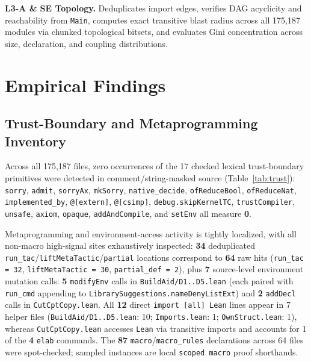 \documentclass[10pt,twocolumn]{article}
\newcommand{\ub}{\_\allowbreak}
\begin{document}
\noindent\textbf{L3-A \& SE Topology.} Deduplicates import edges, verifies DAG acyclicity and reachability from \texttt{Main}, computes exact transitive blast radius across all 175,187 modules via chunked topological bitsets, and evaluates Gini concentration across size, declaration, and coupling distributions.

\section{Empirical Findings}

\subsection{Trust-Boundary and Metaprogramming Inventory}
Across all 175,187 files, zero occurrences of the 17 checked lexical trust-boundary primitives were detected in comment/string-masked source (Table~\ref{tab:trust}): \texttt{sorry}, \texttt{admit}, \texttt{sorryAx}, \texttt{mkSorry}, \texttt{native\ub decide}, \texttt{ofReduceBool}, \texttt{ofReduceNat}, \texttt{implemented\ub by}, \texttt{@[extern]}, \texttt{@[csimp]}, \texttt{debug.skipKernelTC}, \texttt{trustCompiler}, \texttt{unsafe}, \texttt{axiom}, \texttt{opaque}, \texttt{addAndCompile}, and \texttt{setEnv} all measure \textbf{0}.

Metaprogramming and environment-access activity is tightly localized, with all non-macro high-signal sites exhaustively inspected: \textbf{34} deduplicated \texttt{run\ub tac}/\texttt{liftMetaTactic}/\texttt{partial} locations correspond to \textbf{64} raw hits (\texttt{run\ub tac = 32}, \texttt{liftMetaTactic = 30}, \texttt{partial\ub def = 2}), plus \textbf{7} source-level environment mutation calls: \textbf{5} \texttt{modifyEnv} calls in \texttt{BuildAid/D1..D5.lean} (each paired with \texttt{run\ub cmd} appending to \texttt{LibrarySuggestions.nameDenyListExt}) and \textbf{2} \texttt{addDecl} calls in \texttt{CutCptCopy.lean}. All \textbf{12} direct \texttt{import [all] Lean} lines appear in 7 helper files (\texttt{BuildAid/D1..D5.lean}: 10; \texttt{Imports.lean}: 1; \texttt{OwnStruct.lean}: 1), whereas \texttt{CutCptCopy.lean} accesses \texttt{Lean} via transitive imports and accounts for 1 of the \textbf{4} \texttt{elab} commands. The \textbf{87} \texttt{macro}/\texttt{macro\ub rules} declarations across 64 files were spot-checked; sampled instances are local \texttt{scoped macro} proof shorthands.
\end{document}
